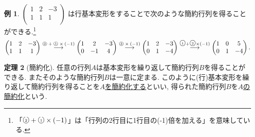 \documentclass[dvipdfmx,a4paper,11pt]{article}
\newcommand{\maru}[1]{\raise0.2ex\hbox{\textcircled{\tiny{#1}}}}
\theoremstyle{definition}
\newtheorem{thm}{定理}
\newtheorem{exa}[thm]{例}
\begin{document}
 
 \begin{exa}
 \label{exa-kanyaku-1}
$
 \begin{pmatrix}
 1& 2& -3  \\
 1& 1& 1  \\
 \end{pmatrix}
 $
は行基本変形をすることで次のような簡約行列を得ることができる.\footnote{「$\maru{2} + \maru{1}\times(-1)$」は「行列の2行目に1行目の(-1)倍を加える」を意味している.}
 \begin{align*}
  \begin{pmatrix}
 1& 2& -3  \\
 1& 1& 1  \\
 \end{pmatrix}
 \overset{\text{$\maru{2} + \maru{1}\times(-1)$}}{\longrightarrow} 
   \begin{pmatrix}
 1& 2& -3  \\
 0& -1& 4  \\
 \end{pmatrix}
 \overset{\text{$\maru{2} \times(-1)$}}{\longrightarrow} 
   \begin{pmatrix}
 1& 2& -3  \\
 0& 1& -4  \\
 \end{pmatrix}
  \overset{\maru{1} + \maru{2}\times(-1)}{\longrightarrow} 
   \begin{pmatrix}
 1& 0& 5  \\
 0& 1& -4  \\
 \end{pmatrix}.
  \end{align*}
\end{exa}

 \begin{tcolorbox}[
    colback = white,
    colframe = green!35!black,
    fonttitle = \bfseries,
    breakable = true]
    \begin{thm}[簡約化]
    任意の行列$A$は基本変形を繰り返して簡約行列$B$を得ることができる. またそのような簡約行列$B$は一意に定まる.
 このように(行)基本変形を繰り返して簡約行列を得ることを\underline{$A$を簡約化する}といい, 得られた簡約行列$B$を\underline{$A$の簡約化}という.
   \end{thm}
 \end{tcolorbox}
\end{document}
